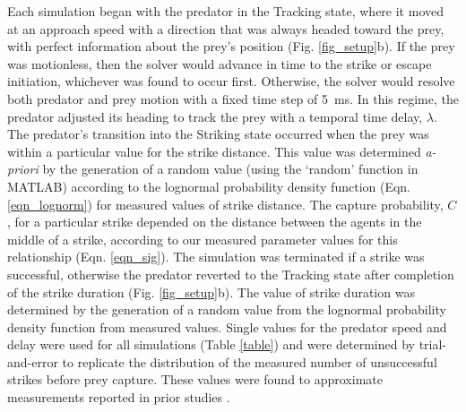\documentclass[]{rsos}%
\begin{document}
Each simulation began with the predator in the Tracking state, where it moved at an approach speed with a direction that was always headed toward the prey, with perfect information about the prey's position (Fig. \ref{fig_setup}b). 
If the prey was motionless, then the solver would advance in time to the strike or escape initiation, whichever was found to occur first.
Otherwise, the solver would resolve both predator and prey motion with a fixed time step of \SI{5}{\ms}. 
In this regime, the predator adjusted its heading to track the prey with a temporal time delay, $\lambda$.  
The predator's transition into the Striking state occurred when the prey was within a particular value for the strike distance. 
This value was determined \textit{a-priori} by the generation of a random value (using the `random' function in MATLAB) according to the lognormal probability density function (Eqn. \ref{eqn_lognorm}) for measured values of strike distance.
The capture probability, $C$, for a particular strike depended on the distance between the agents in the middle of a strike, according to our measured parameter values for this relationship (Eqn. \ref{eqn_sig}).
The simulation was terminated if a strike was successful, otherwise the predator reverted to the Tracking state after completion of the strike duration (Fig. \ref{fig_setup}b).
The value of strike duration was determined by the generation of a random value from the lognormal probability density function from measured values.
Single values for the predator speed and delay were used for all simulations (Table \ref{table}) and were determined by trial-and-error to replicate the distribution of the measured number of unsuccessful strikes before prey capture. 
These values were found to approximate measurements reported in prior studies \cite{McHenry:2005tc, Stewart:2013bha}. 
\end{document}
